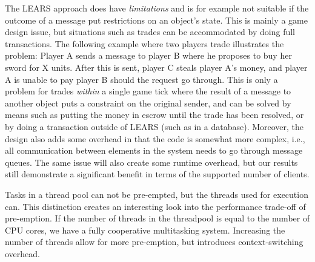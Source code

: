 The LEARS approach does have \textit{limitations} and is for example not
suitable if the outcome of a message put restrictions on an object's
state. This is mainly a game design issue, but situations such as
trades can be accommodated by doing full transactions. 
The following
example where two players trade illustrates the problem: Player A
sends a message to player B where he proposes to buy her sword for X
units. After this is sent, player C steals player A's money, and
player A is unable to pay player B should the request go through. 
This is only a problem for trades \textit{within} a single game tick
where the result of a message to another object puts a constraint on
the original sender, and can be solved by means such as putting the
money in escrow until the trade has been resolved, or by doing a
transaction outside of LEARS (such as in a database).
%
Moreover, the design also adds some overhead in that the code is
somewhat more complex, i.e., all communication between elements in the
system needs to go through message queues. The same issue will also
create some runtime overhead, but our results still demonstrate a
significant benefit in terms of the supported number of clients.

Tasks in a thread pool can not be pre-empted, but the threads used for execution can. This distinction creates an interesting look into the performance trade-off of pre-emption. If the number of threads in the threadpool is equal to the number of CPU cores, we have a fully cooperative multitasking system. Increasing the number of threads allow for more pre-emption, but introduces context-switching overhead.
